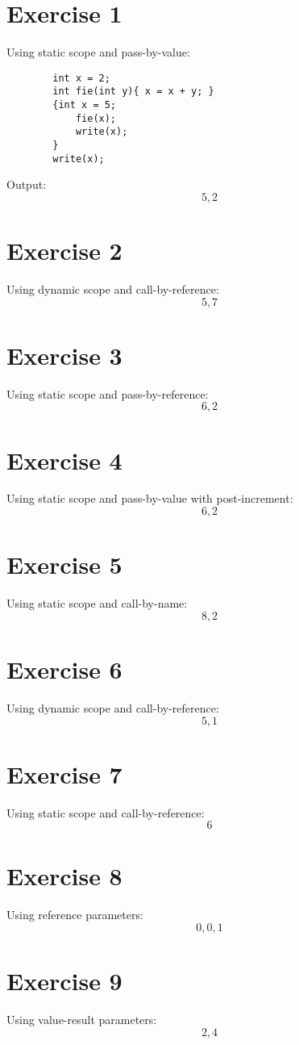 \documentclass[12pt]{article}
\begin{document}
	
	\section*{Exercise 1}
	Using static scope and pass-by-value:
	\begin{verbatim}
		int x = 2;
		int fie(int y){ x = x + y; }
		{int x = 5;
			fie(x);
			write(x);
		}
		write(x);
	\end{verbatim}
	Output: 
	\[ \boxed{5, 2} \]
	
	\section*{Exercise 2}
	Using dynamic scope and call-by-reference:
	\[ \boxed{5, 7} \]
	
	\section*{Exercise 3}
	Using static scope and pass-by-reference:
	\[ \boxed{6, 2} \]
	
	\section*{Exercise 4}
	Using static scope and pass-by-value with post-increment:
	\[ \boxed{6, 2} \]
	
	\section*{Exercise 5}
	Using static scope and call-by-name:
	\[ \boxed{8, 2} \]
	
	\section*{Exercise 6}
	Using dynamic scope and call-by-reference:
	\[ \boxed{5, 1} \]
	
	\section*{Exercise 7}
	Using static scope and call-by-reference:
	\[ \boxed{6} \]
	
	\section*{Exercise 8}
	Using reference parameters:
	\[ \boxed{0, 0, 1} \]
	
	\section*{Exercise 9}
	Using value-result parameters:
	\[ \boxed{2, 4} \]
	
\end{document}
